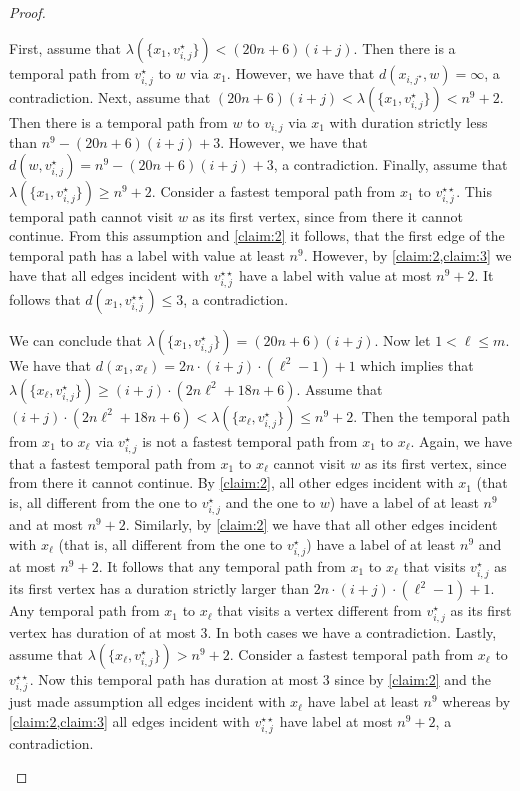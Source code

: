 \documentclass[a4paper,UKenglish,cleveref, autoref, thm-restate, anonymous]{lipics-v2021}
\begin{document}
\begin{proof}
\begin{claimproof}
    First, assume that $\lambda(\{x_1,v_{i,j}^{\star}\})<(20n+6)(i+j)$. Then there is a temporal path from $v_{i,j}^\star$ to $w$ via $x_1$. However, we have that $d(x_{i,j^\star},w)=\infty$, a contradiction.
    Next, assume that $(20n+6)(i+j)<\lambda(\{x_1,v_{i,j}^{\star}\})<n^9+2$. Then there is a temporal path from $w$ to $v_{i,j}$ via $x_1$ with duration strictly less than $n^9-(20n+6)(i+j)+3$. However, we have that $d(w,v_{i,j}^\star)=n^9-(20n+6)(i+j)+3$, a contradiction.
    Finally, assume that $\lambda(\{x_1,v_{i,j}^{\star}\})\ge n^9+2$. Consider a fastest temporal path from $x_1$ to $v_{i,j}^{\star\star}$. This temporal path cannot visit $w$ as its first vertex, since from there it cannot continue. 
    From this assumption and \cref{claim:2} it follows, that the first edge of the temporal path has a label with value at least $n^9$. However, by \cref{claim:2,claim:3} we have that all edges incident with $v_{i,j}^{\star\star}$ have a label with value at most $n^9+2$. It follows that $d(x_1,v_{i,j}^{\star\star})\le 3$, a contradiction.

    We can conclude that $\lambda(\{x_1,v_{i,j}^{\star}\})=(20n+6)(i+j)$. Now let $1<\ell\le m$. We have that $d(x_1,x_\ell)=2n\cdot (i+j)\cdot(\ell^2-1)+1$ which implies that $\lambda(\{x_\ell,v_{i,j}^{\star}\})\ge (i+j)\cdot (2n\ell^2 +18n+6)$. Assume that $(i+j)\cdot (2n\ell^2 +18n+6) <\lambda(\{x_\ell,v_{i,j}^{\star}\})\le n^9+2$. Then the temporal path from $x_1$ to $x_\ell$ via $v_{i,j}^\star$ is not a fastest temporal path from $x_1$ to $x_\ell$. Again, we have that a fastest temporal path from $x_1$ to $x_\ell$ cannot visit $w$ as its first vertex, since from there it cannot continue. By \cref{claim:2}, all other edges incident with $x_1$ (that is, all different from the one to $v_{i,j}^\star$ and the one to $w$) have a label of at least $n^9$ and at most $n^9+2$. Similarly, by \cref{claim:2} we have that all other edges incident with $x_\ell$ (that is, all different from the one to $v_{i,j}^\star$) have a label of at least $n^9$ and at most $n^9+2$. It follows that any temporal path from $x_1$ to $x_\ell$ that visits $v_{i,j}^\star$ as its first vertex has a duration strictly larger than $2n\cdot (i+j)\cdot(\ell^2-1)+1$. Any temporal path from $x_1$ to $x_\ell$ that visits a vertex different from $v_{i,j}^\star$ as its first vertex has duration of at most $3$. In both cases we have a contradiction. 
    Lastly, assume that $\lambda(\{x_\ell,v_{i,j}^{\star}\})> n^9+2$. Consider a fastest temporal path from $x_\ell$ to $v_{i,j}^{\star\star}$. Now this temporal path has duration at most 3 since by \cref{claim:2} and the just made assumption all edges incident with $x_\ell$ have label at least $n^9$ whereas by \cref{claim:2,claim:3} all edges incident with $v_{i,j}^{\star\star}$ have label at most $n^9+2$, a contradiction. 
\end{claimproof}


\end{proof}
\end{document}
